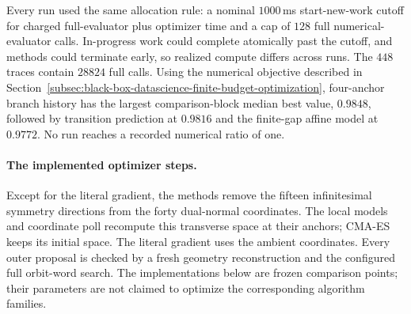 Every run used the same allocation rule: a nominal \(1000\)\,ms
start-new-work cutoff for charged full-evaluator plus optimizer time and a cap
of \(128\) full numerical-evaluator calls.  In-progress work could complete
atomically past the cutoff, and methods could terminate early, so realized
compute differs across runs.  The \(448\) traces contain \(28824\) full calls.
Using the numerical objective described in
Section~\ref{subsec:black-box-datascience-finite-budget-optimization},
four-anchor branch history has the largest comparison-block median best value,
\(0.9848\), followed by transition prediction at \(0.9816\) and the finite-gap
affine model at \(0.9772\).  No run reaches
a recorded numerical ratio of one.

\paragraph{The implemented optimizer steps.}
Except for the literal gradient, the methods remove the fifteen infinitesimal
symmetry directions from the forty dual-normal coordinates. The local models
and coordinate poll recompute this transverse space at their anchors;
CMA-ES keeps its initial space. The literal gradient uses the ambient
coordinates.  Every
outer proposal is checked by a fresh geometry reconstruction and the
configured full orbit-word search.  The implementations below are frozen
comparison points; their parameters are not claimed to optimize the
corresponding algorithm families.

